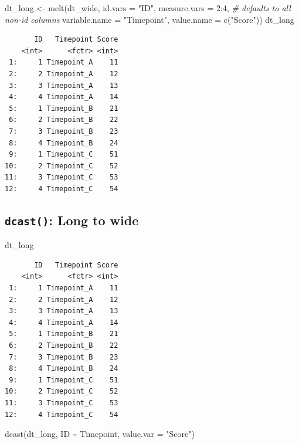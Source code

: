 \documentclass[
]{book}
\newenvironment{Shaded}{\begin{snugshade}}{\end{snugshade}}
\newcommand{\AttributeTok}[1]{\textcolor[rgb]{0.77,0.63,0.00}{#1}}
\newcommand{\CommentTok}[1]{\textcolor[rgb]{0.56,0.35,0.01}{\textit{#1}}}
\newcommand{\DecValTok}[1]{\textcolor[rgb]{0.00,0.00,0.81}{#1}}
\newcommand{\FunctionTok}[1]{\textcolor[rgb]{0.00,0.00,0.00}{#1}}
\newcommand{\NormalTok}[1]{#1}
\newcommand{\OtherTok}[1]{\textcolor[rgb]{0.56,0.35,0.01}{#1}}
\newcommand{\SpecialCharTok}[1]{\textcolor[rgb]{0.00,0.00,0.00}{#1}}
\newcommand{\StringTok}[1]{\textcolor[rgb]{0.31,0.60,0.02}{#1}}
\begin{document}
\begin{Shaded}
\begin{Highlighting}[]
\NormalTok{dt\_long }\OtherTok{\textless{}{-}} \FunctionTok{melt}\NormalTok{(dt\_wide, }\AttributeTok{id.vars =} \StringTok{"ID"}\NormalTok{,}
                \AttributeTok{measure.vars =} \DecValTok{2}\SpecialCharTok{:}\DecValTok{4}\NormalTok{, }\CommentTok{\# defaults to all non{-}id columns}
                \AttributeTok{variable.name =} \StringTok{"Timepoint"}\NormalTok{,}
                \AttributeTok{value.name =} \FunctionTok{c}\NormalTok{(}\StringTok{"Score"}\NormalTok{))}
\NormalTok{dt\_long}
\end{Highlighting}
\end{Shaded}

\begin{verbatim}
       ID   Timepoint Score
    <int>      <fctr> <int>
 1:     1 Timepoint_A    11
 2:     2 Timepoint_A    12
 3:     3 Timepoint_A    13
 4:     4 Timepoint_A    14
 5:     1 Timepoint_B    21
 6:     2 Timepoint_B    22
 7:     3 Timepoint_B    23
 8:     4 Timepoint_B    24
 9:     1 Timepoint_C    51
10:     2 Timepoint_C    52
11:     3 Timepoint_C    53
12:     4 Timepoint_C    54
\end{verbatim}

\hypertarget{dcast-long-to-wide}{%
\subsection{\texorpdfstring{\texttt{dcast()}: Long to wide}{dcast(): Long to wide}}\label{dcast-long-to-wide}}

\begin{Shaded}
\begin{Highlighting}[]
\NormalTok{dt\_long}
\end{Highlighting}
\end{Shaded}

\begin{verbatim}
       ID   Timepoint Score
    <int>      <fctr> <int>
 1:     1 Timepoint_A    11
 2:     2 Timepoint_A    12
 3:     3 Timepoint_A    13
 4:     4 Timepoint_A    14
 5:     1 Timepoint_B    21
 6:     2 Timepoint_B    22
 7:     3 Timepoint_B    23
 8:     4 Timepoint_B    24
 9:     1 Timepoint_C    51
10:     2 Timepoint_C    52
11:     3 Timepoint_C    53
12:     4 Timepoint_C    54
\end{verbatim}

\begin{Shaded}
\begin{Highlighting}[]
\FunctionTok{dcast}\NormalTok{(dt\_long, ID }\SpecialCharTok{\textasciitilde{}}\NormalTok{ Timepoint,}
      \AttributeTok{value.var =} \StringTok{"Score"}\NormalTok{)}
\end{Highlighting}
\end{Shaded}
\end{document}
